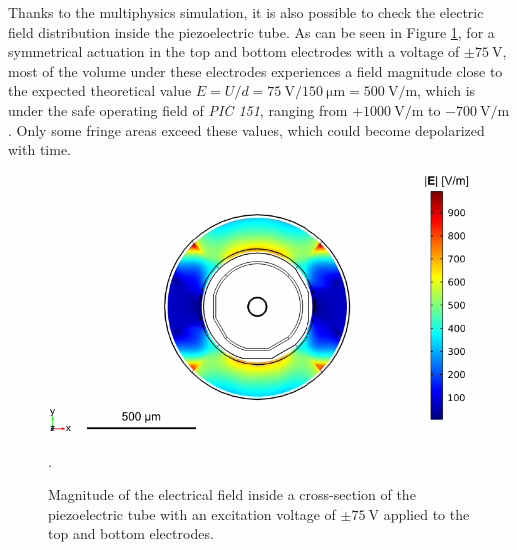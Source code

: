 
Thanks to the multiphysics simulation, it is also possible to check the electric field distribution inside the piezoelectric tube. As can be seen in Figure \ref{fig:field}, for a symmetrical actuation in the top and bottom electrodes with a voltage of $\pm \SI{75}{\volt}$, most of the volume under these electrodes experiences a field magnitude close to the expected theoretical value $E=U/d = \SI{75}{\volt}/\SI{150}{\micro\meter} = \SI{500}{\volt/\meter}$, which is under the safe operating field of \textit{PIC 151}, ranging from $ +\SI{1000}{\volt/\meter}$ to $ -\SI{700}{\volt/\meter}$. Only some fringe areas exceed these values, which could become depolarized with time.
\begin{figure}[h!]\centering
      \includegraphics{figures/30_DesignSimulation/Mechanical/field.pdf}
      \caption{Magnitude of the electrical field inside a cross-section of the piezoelectric tube with an excitation voltage of $\pm \SI{75}{\volt}$ applied to the top and bottom electrodes.}.
      \label{fig:field}
\end{figure}
      
      
